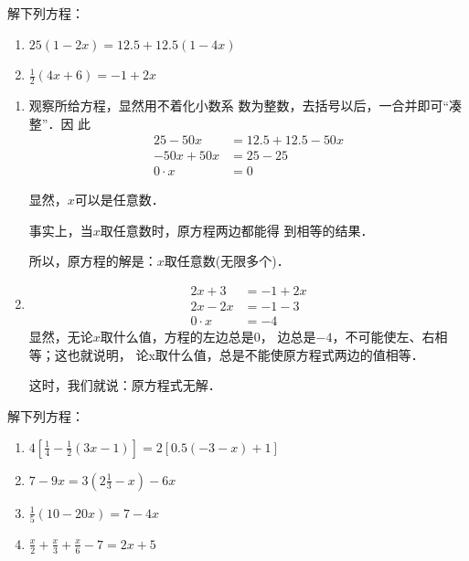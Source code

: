 \begin{example}
解下列方程：
\begin{enumerate}
    \item $25(1-2x)=12.5+12.5(1-4x)$
    \item $\frac{1}{2}(4x+6)=-1+2x$
\end{enumerate}
\end{example}

\begin{solution}
\begin{enumerate}
    \item     观察所给方程，显然用不着化小数系
    数为整数，去括号以后，一合并即可“凑整”．因
    此
    \begin{align*}
25-50x&=12.5+12.5-50x  \tag{去括号}\\
    -50x+50x&=25-25  \tag{移项}\\
    0\cdot x&=0 \tag{合并同类项}    
    \end{align*}
    
    显然，$x$可以是任意数．

    事实上，当$x$取任意数时，原方程两边都能得
到相等的结果．

    所以，原方程的解是：$x$取任意数(无限多个)．
    
\item     \begin{align*}
    2x+3&=-1+2x  \tag{去括号}\\
        2x-2x&=-1-3  \tag{移项}\\
        0\cdot x&=-4 \tag{合并同类项}    
        \end{align*}
        显然，无论$x$取什么值，方程的左边总是0，
    边总是$-4$，不可能使左、右相等；这也就说明，
    论x取什么值，总是不能使原方程式两边的值相等．

        这时，我们就说：原方程式无解．
\end{enumerate}    
\end{solution}

\begin{ex}
解下列方程：
\begin{enumerate}
    \item \quad$4\left[\frac{1}{4}-\frac{1}{2}(3x-1)\right]=2[0.5(-3-x)+1]$
    \item \quad$7-9x=3\left(2\frac{1}{3}-x\right)-6x$
    \item \quad$\frac{1}{5}(10-20x)=7-4x$
    \item \quad$\frac{x}{2}+\frac{x}{3}+\frac{x}{6}-7=2x+5$
\end{enumerate}
\end{ex}


